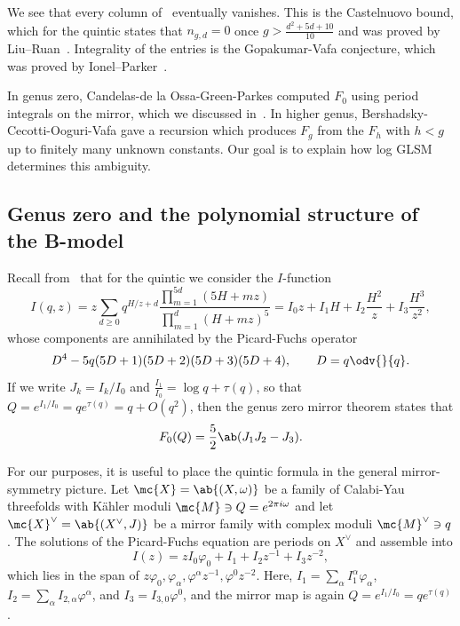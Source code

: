 We see that every column of~ eventually vanishes. This is the Castelnuovo bound, which for the quintic states that \(n_{g,d} = 0\) once \(g > \frac{d^2+5d+10}{10}\) and was proved by Liu--Ruan~\cite{LiuRuanCastelnuovo}. Integrality of the entries is the Gopakumar-Vafa conjecture, which was proved by Ionel--Parker~\cite{IonelParker2018}.

In genus zero, Candelas-de la Ossa-Green-Parkes computed \(F_0\) using period integrals on the mirror, which we discussed in~. In higher genus, Bershadsky-Cecotti-Ooguri-Vafa gave a recursion which produces \(F_g\) from the \(F_h\) with \(h < g\) up to finitely many unknown constants. Our goal is to explain how log GLSM determines this ambiguity.

\subsection{Genus zero and the polynomial structure of the B-model}%
\label{sub:Genus zero and the polynomial structure of the B-model}

Recall from~ that for the quintic we consider the \(I\)-function
\[
    I(q,z) = z\sum_{d \geq 0} q^{H/z+d} \frac{\prod_{m=1}^{5d}(5H+mz)}{\prod_{m=1}^d (H+mz)^5} = I_0 z + I_1 H + I_2 \frac{H^2}{z} + I_3 \frac{H^3}{z^2},
\]
whose components are annihilated by the Picard-Fuchs operator
\[ D^4 - 5q(5D+1)(5D+2)(5D+3)(5D+4), \qquad D = q \odv{}{q}. \]
If we write \(J_k = I_k/I_0\) and \(\frac{I_1}{I_0} = \log q + \tau(q)\), so that \(Q = e^{I_1/I_0} = qe^{\tau(q)} = q + O(q^2)\), then the genus zero mirror theorem states that
\[ F_0(Q) = \frac{5}{2}\ab(J_1 J_2 - J_3). \]

For our purposes, it is useful to place the quintic formula in the general mirror-symmetry picture. Let \(\mc{X} = \ab\{(X,\omega)\}\) be a family of Calabi-Yau threefolds with Kähler moduli \(\mc{M} \ni Q = e^{2\pi i \omega}\) and let \(\mc{X}^{\vee} = \ab\{(X^{\vee},J)\}\) be a mirror family with complex moduli \(\mc{M}^{\vee} \ni q\). The solutions of the Picard-Fuchs equation are periods on \(X^{\vee}\) and assemble into
\[ I(z) = zI_0\varphi_0 + I_1 + I_2 z^{-1} + I_3 z^{-2}, \]
which lies in the span of \(z\varphi_0, \varphi_{\alpha}, \varphi^{\alpha}z^{-1}, \varphi^0 z^{-2}\). Here, \(I_1 = \sum_{\alpha} I_1^{\alpha}\varphi_{\alpha}\), \(I_2 = \sum_{\alpha} I_{2,\alpha}\varphi^{\alpha}\), and \(I_3 = I_{3,0}\varphi^0\), and the mirror map is again \(Q = e^{I_1/I_0} = qe^{\tau(q)}\).

